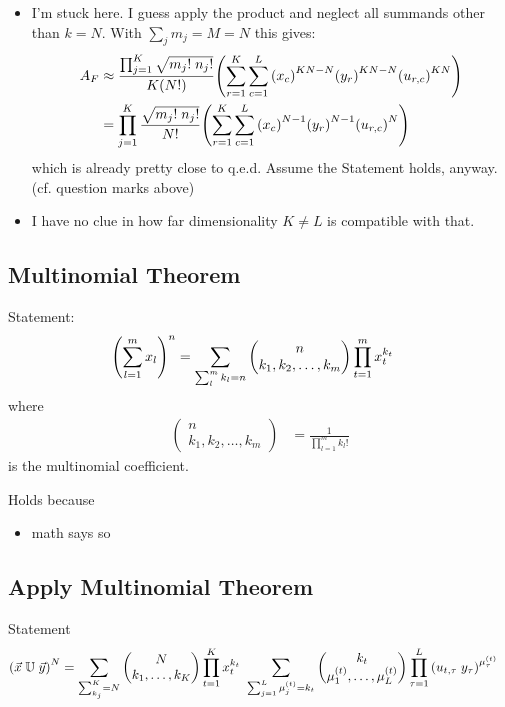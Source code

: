 \documentclass[
	english,
	a4paper,
	fontsize=10pt,
	parskip=half,
	titlepage=true,
	DIV=12,
	final
]{scrreprt}
\begin{document}
\begin{itemize}
\item {\color{red} I'm stuck here. I guess apply the product and neglect all summands other than $k=N$.
	With $\sum_j m_j = M = N$ this gives:}
\begin{align}
	A_F
&\approx
	\frac
		{\prod_{j=1}^{K} \sqrt{m_j! \; n_j!}}
		{K(N!)}
	\qty( 
		\sum_{r=1}^{K}
		\sum_{c=1}^{L}
			\qty(x_c)^{KN - N}
			\qty(y_r)^{KN - N}
			\qty(u_{r,c})^{KN}
	) \\
&=
	\prod_{j=1}^{K}
		\frac
			{\sqrt{m_j! \; n_j!}}
			{N!}
		\qty(
			\sum_{r=1}^{K}
			\sum_{c=1}^{L}
				\qty(x_c)^{N-1}
				\qty(y_r)^{N-1}
				\qty(u_{r,c})^{N}
		)
\end{align}
	{\color{red} which is already pretty close to q.e.d. Assume the Statement holds, anyway. 
	(cf. question marks above)}
\item {\color{red} I have no clue in how far dimensionality $K \neq L$ is compatible with that.}
\end{itemize}

\subsection{Multinomial Theorem}
Statement:
\begin{align}
	\qty(
		\sum_{l=1}^{m} x_l
	)^{n}
&=
	\sum_{\sum_l^m k_l = n}
	\begin{pmatrix}
		n \\ k_1, k_2, \ldots, k_m
	\end{pmatrix}
	\prod_{t=1}^{m}
		x_t^{k_t}
\end{align}
where
\begin{align}
	\begin{pmatrix}
		n \\ k_1, k_2, \ldots, k_m
	\end{pmatrix}
&=
	\frac{1}
	{\prod_{l=1}^m k_l !}
\end{align}
is the multinomial coefficient.

Holds because
\begin{itemize}
\item math says so
\end{itemize}

\subsection{Apply Multinomial Theorem}
Statement
\begin{align}
	\qty( \vec{x} \; \mathbb{U} \; \vec{y} )^{N}
&=
	\sum_{\sum_{k_j}^K = N}
		\begin{pmatrix}
			N \\ k_1, \ldots, k_K
		\end{pmatrix}
		\prod_{t=1}^K
			x_t^{k_t} ~
			\sum_{\sum_{j=1}^{L} \mu_j^{(t)} = k_t}
				\begin{pmatrix}
					k_t \\ \mu_1^{(t)}, \ldots, \mu_L^{(t)}
				\end{pmatrix}
				\prod_{\tau=1}^{L}
					\qty(
						u_{t, \tau} \; y_\tau
					)^{\mu_\tau^{(t)}}
\end{align}
\end{document}
